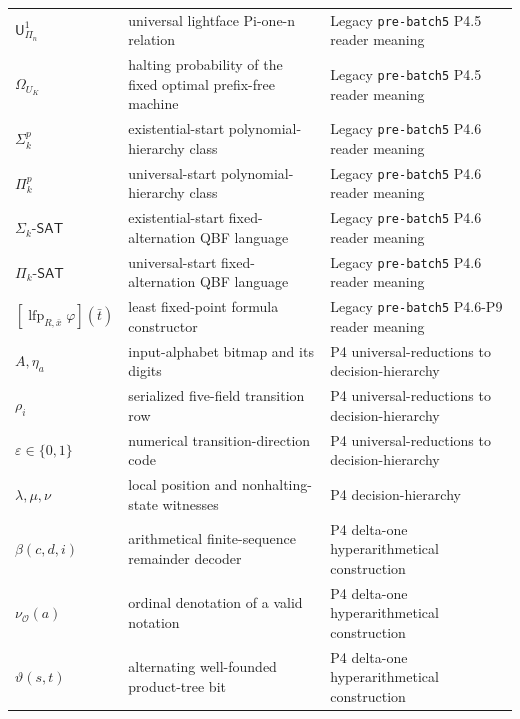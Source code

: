 \begin{longtable}{@{}p{}p{}p{}@{}}
\(\mathsf U^1_{\Pi_n}\) & universal lightface Pi-one-n relation & Legacy \texttt{pre-\allowbreak{}batch5} P4.\allowbreak{}5 reader meaning \\
\(\Omega_{U_K}\) & halting probability of the fixed optimal prefix-free machine & Legacy \texttt{pre-\allowbreak{}batch5} P4.\allowbreak{}5 reader meaning \\
\(\Sigma^p_k\) & existential-start polynomial-hierarchy class & Legacy \texttt{pre-\allowbreak{}batch5} P4.\allowbreak{}6 reader meaning \\
\(\Pi^p_k\) & universal-start polynomial-hierarchy class & Legacy \texttt{pre-\allowbreak{}batch5} P4.\allowbreak{}6 reader meaning \\
\(\Sigma_k\text{-}\mathsf{SAT}\) & existential-start fixed-alternation QBF language & Legacy \texttt{pre-\allowbreak{}batch5} P4.\allowbreak{}6 reader meaning \\
\(\Pi_k\text{-}\mathsf{SAT}\) & universal-start fixed-alternation QBF language & Legacy \texttt{pre-\allowbreak{}batch5} P4.\allowbreak{}6 reader meaning \\
\([\operatorname{lfp}_{R,\bar x}\varphi](\bar t)\) & least fixed-point formula constructor & Legacy \texttt{pre-\allowbreak{}batch5} P4.\allowbreak{}6-\allowbreak{}P9 reader meaning \\
\(A,\allowbreak \eta_a\) & input-alphabet bitmap and its digits & P4 universal-\allowbreak{}reductions to decision-\allowbreak{}hierarchy \\
\(\rho_i\) & serialized five-field transition row & P4 universal-\allowbreak{}reductions to decision-\allowbreak{}hierarchy \\
\(\varepsilon\in\{0,\allowbreak 1\}\) & numerical transition-direction code & P4 universal-\allowbreak{}reductions to decision-\allowbreak{}hierarchy \\
\(\lambda,\allowbreak \mu,\allowbreak \nu\) & local position and nonhalting-state witnesses & P4 decision-\allowbreak{}hierarchy \\
\(\beta(c,\allowbreak d,\allowbreak i)\) & arithmetical finite-sequence remainder decoder & P4 delta-\allowbreak{}one hyperarithmetical construction \\
\(\nu_{\mathcal O}(a)\) & ordinal denotation of a valid notation & P4 delta-\allowbreak{}one hyperarithmetical construction \\
\(\vartheta(s,\allowbreak t)\) & alternating well-founded product-tree bit & P4 delta-\allowbreak{}one hyperarithmetical construction \\

\end{longtable}
